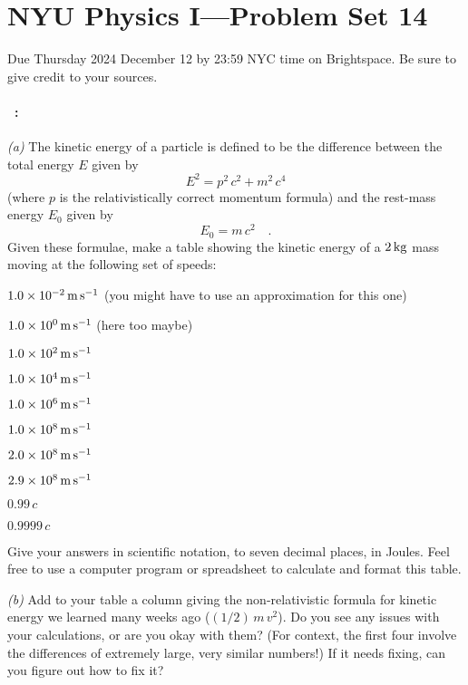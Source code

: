 \documentclass[12pt]{article}
\begin{document}
\section*{NYU Physics I---Problem Set 14}

Due Thursday 2024 December 12 by 23:59 NYC time on Brightspace.
Be sure to give credit to your sources.

\paragraph{\problemname~\theproblem:}%
\textsl{(a)} The kinetic energy of a particle is defined to be the difference between the
total energy $E$ given by
\begin{equation}
E^2 = p^2\,c^2 + m^2\,c^4
\end{equation}
(where $p$ is the relativistically correct momentum formula) and the
rest-mass energy $E_0$ given by
\begin{equation}
E_0 = m\,c^2 \quad.
\end{equation}
Given these formulae, make a table showing the kinetic energy of a $2\,\mathrm{kg}$ mass
moving at the following set of speeds:
\begin{trivlist}
\item $1.0\times10^{-2}\,\mathrm{m}\,\mathrm{s}^{-1}$ (you might have to use an approximation for this one)
\item $1.0\times10^0\,\mathrm{m}\,\mathrm{s}^{-1}$ (here too maybe)
\item $1.0\times10^2\,\mathrm{m}\,\mathrm{s}^{-1}$
\item $1.0\times10^4\,\mathrm{m}\,\mathrm{s}^{-1}$
\item $1.0\times10^6\,\mathrm{m}\,\mathrm{s}^{-1}$
\item $1.0\times10^8\,\mathrm{m}\,\mathrm{s}^{-1}$
\item $2.0\times10^8\,\mathrm{m}\,\mathrm{s}^{-1}$
\item $2.9\times10^8\,\mathrm{m}\,\mathrm{s}^{-1}$
\item $0.99\,c$
\item $0.9999\,c$
\end{trivlist}
Give your answers in scientific notation, to seven decimal places, in Joules. Feel free to use
a computer program or spreadsheet to calculate and format this table.

\textsl{(b)} Add to your table a column giving the non-relativistic
formula for kinetic energy we learned many weeks ago ($(1/2)\,m\,v^2$). Do you see any issues
with your calculations, or are you okay with them? (For context, the
first four involve the differences of extremely large, very similar
numbers!) If it needs fixing, can you figure out how to fix it?
\end{document}
